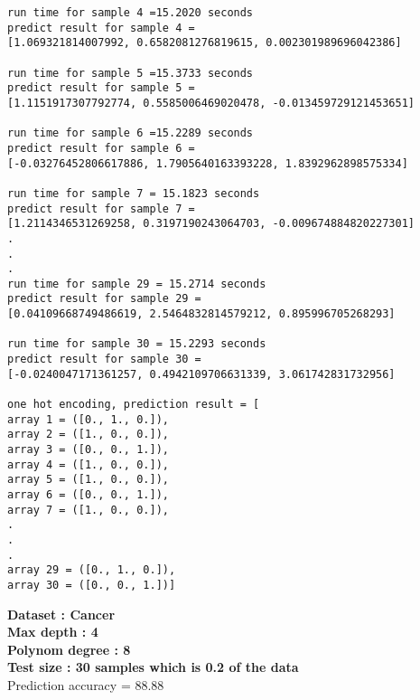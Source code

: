 \documentclass[11pt]{article}
\begin{document}
\begin{lstlisting}
run time for sample 4 =15.2020 seconds
predict result for sample 4 =
[1.069321814007992, 0.6582081276819615, 0.002301989696042386]

run time for sample 5 =15.3733 seconds
predict result for sample 5 =
[1.1151917307792774, 0.5585006469020478, -0.013459729121453651]

run time for sample 6 =15.2289 seconds
predict result for sample 6 =
[-0.03276452806617886, 1.7905640163393228, 1.8392962898575334]

run time for sample 7 = 15.1823 seconds
predict result for sample 7 =
[1.2114346531269258, 0.3197190243064703, -0.009674884820227301]
.
.
.
run time for sample 29 = 15.2714 seconds
predict result for sample 29 =
[0.04109668749486619, 2.5464832814579212, 0.895996705268293]

run time for sample 30 = 15.2293 seconds
predict result for sample 30 =
[-0.0240047171361257, 0.4942109706631339, 3.061742831732956]

one hot encoding, prediction result = [
array 1 = ([0., 1., 0.]), 
array 2 = ([1., 0., 0.]), 
array 3 = ([0., 0., 1.]),
array 4 = ([1., 0., 0.]), 
array 5 = ([1., 0., 0.]), 
array 6 = ([0., 0., 1.]), 
array 7 = ([1., 0., 0.]),
.
.
.
array 29 = ([0., 1., 0.]), 
array 30 = ([0., 0., 1.])]
\end{lstlisting}
\newpage
\textbf{Dataset : Cancer}\\
\textbf{Max depth : 4}\\
\textbf{Polynom degree : 8 }\\
\textbf{Test size : 30 samples which is 0.2 of the data}\\
\large {Prediction accuracy = 88.88}\\
\end{document}

